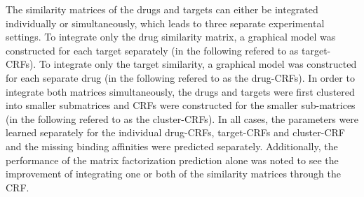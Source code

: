 \documentclass[
journal=jacsat, %
manuscript=article]{achemso}
\begin{document}
The similarity matrices of the drugs and targets can either be integrated individually or simultaneously, which leads to three separate experimental settings. To integrate only the drug similarity matrix, a graphical model was constructed for each target separately (in the following refered to as target-CRFs). To integrate only the target similarity, a graphical model was constructed for each separate drug (in the following refered to as the drug-CRFs). In order to integrate both matrices simultaneously, the drugs and targets were first clustered into smaller submatrices and CRFs were constructed for the smaller sub-matrices (in the following refered to as the cluster-CRFs). In all cases, the parameters were learned separately for the individual drug-CRFs, target-CRFs and cluster-CRF and the missing binding affinities were predicted separately. 
Additionally, the performance of the matrix factorization prediction alone was noted to see the improvement of integrating one or both of the similarity matrices through the CRF. 
\end{document}
